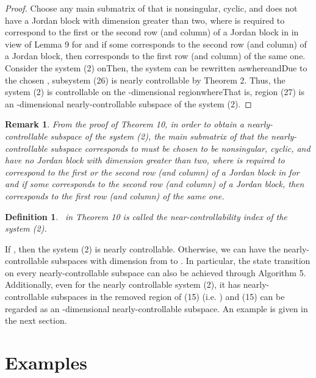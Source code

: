\documentclass[journal,a4paper,12pt,onecolumn]{IEEEtran}
\newtheorem{definition}[theorem]{Definition}
\newtheorem{remark}[theorem]{Remark}
\begin{document}
\begin{proof}
Choose any main submatrix  of  that is
nonsingular, cyclic, and does not have a Jordan block with dimension greater
than two, where  is required to correspond to the first or the second
row (and column) of a Jordan block in  in view of Lemma 9 for  and if some  corresponds to the second row (and column) of a
Jordan block, then  corresponds to the first row (and column) of
the same one. Consider the system (2) onThen, the system can be rewritten aswhereandDue to the chosen , subsystem (26) is nearly
controllable by Theorem 2. Thus, the system (2) is controllable on the -dimensional regionwhereThat is, region (27) is an -dimensional nearly-controllable subspace of
the system (2).
\end{proof}



\begin{remark}
From the proof of Theorem 10, in order to obtain a nearly-controllable
subspace of the system (2), the main submatrix  of  that the nearly-controllable subspace corresponds to must be chosen to be
nonsingular, cyclic, and have no Jordan block with dimension greater than
two, where  is required to correspond to the first or the second row
(and column) of a Jordan block in  for  and if some 
corresponds to the second row (and column) of a Jordan block, then 
corresponds to the first row (and column) of the same one.
\end{remark}



\begin{definition}
\ in Theorem 10 is called the near-controllability index of the system
(2).
\end{definition}



If , then the system (2) is nearly controllable. Otherwise, we can have
the nearly-controllable subspaces with dimension from  to . In
particular, the state transition on every nearly-controllable subspace can
also be achieved through Algorithm 5. Additionally, even for the nearly
controllable system (2), it has nearly-controllable subspaces in the removed
region of (15) (i.e. ) and (15) can be regarded as an -dimensional nearly-controllable subspace. An example is given in the next
section.



\section{Examples}
\end{document}
